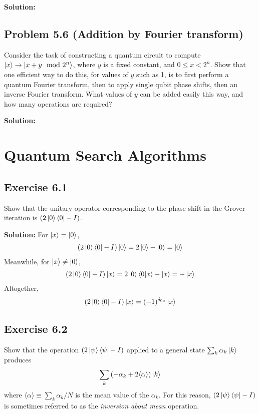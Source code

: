 \documentclass{book}
\begin{document}
    \textbf{Solution:}

\section*{Problem 5.6 (Addition by Fourier transform)}
    Consider the task of constructing a quantum circuit to compute $\ket{x}\rightarrow \ket{x +y \mod 2^n}$, where $y$ is a fixed constant, and $0\leq x < 2^n$. Show that one efficient way to do this, for values of $y$ such as 1, is to first perform a quantum Fourier transform, then to apply single qubit phase shifts, then an inverse Fourier transform. What values of $y$ can be added easily this way, and how many operations are required?
    
    \textbf{Solution:}

\chapter{Quantum Search Algorithms}

\section*{Exercise 6.1} 
    Show that the unitary operator corresponding to the phase shift in the Grover iteration is $(2\ket{0}\bra{0}-I)$.
    
    \textbf{Solution:} For $\ket{x} = \ket{0}$,
    \begin{align}
        (2\ket{0}\bra{0}-I)\ket{0} = 2\ket{0}-\ket{0} = \ket{0}
    \end{align}
    Meanwhile, for $\ket{x} \neq \ket{0}$,
    \begin{align}
        (2\ket{0}\bra{0}-I)\ket{x} = 2\ket{0}\braket{0}{x}-\ket{x} = -\ket{x}
    \end{align}
    Altogether,
    \begin{align}
        (2\ket{0}\bra{0}-I)\ket{x} = (-1)^{\delta_{0x}}\ket{x}
    \end{align}

\section*{Exercise 6.2}
    Show that the operation $(2\ket{\psi}\bra{\psi}-I)$ applied to a general state $\sum_k \alpha_k \ket{k}$ produces
    \begin{align}
        \sum_k \left(-\alpha_k+2\langle\alpha\rangle\right)\ket{k}
    \end{align}
    where $\langle\alpha\rangle \equiv \sum_k\alpha_k/N$ is the mean value of the $\alpha_k$. For this reason, $(2\ket{\psi}\bra{\psi}-I)$ is sometimes referred to as the \emph{inversion about mean} operation.
    
\end{document}
